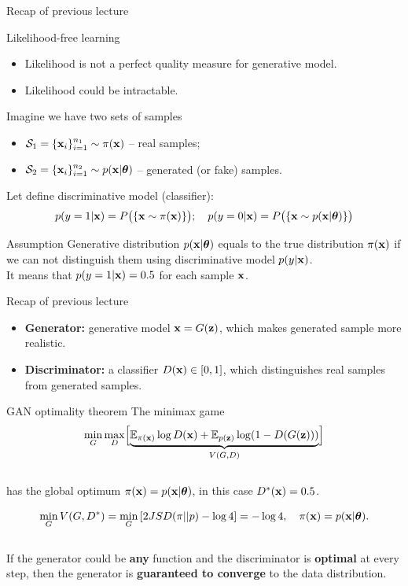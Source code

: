 \begin{frame}{Recap of previous lecture}
	\begin{block}{Likelihood-free learning}
		\begin{itemize}
			\item Likelihood is not a perfect quality measure for generative model.
			\item Likelihood could be intractable.
		\end{itemize}
	\end{block}
	Imagine we have two sets of samples 
	\begin{itemize}
		\item $\mathcal{S}_1 = \{\mathbf{x}_i\}_{i=1}^{n_1} \sim \pi(\mathbf{x})$ -- real samples;
		\item $\mathcal{S}_2 = \{\mathbf{x}_i\}_{i=1}^{n_2} \sim p(\mathbf{x} | \boldsymbol{\theta})$ -- generated (or fake) samples.
	\end{itemize}
	Let define discriminative model (classifier):
	\[
		p(y = 1 | \mathbf{x}) = P\bigl(\{\mathbf{x} \sim \pi(\mathbf{x})\}\bigr); \quad p(y = 0 | \mathbf{x}) = P\bigl(\{\mathbf{x} \sim p(\mathbf{x} | \boldsymbol{\theta})\}\bigr)
	\]
	\vspace{-0.5cm}
	\begin{block}{Assumption}
		Generative distribution $p(\mathbf{x} | \boldsymbol{\theta})$ equals to the true distribution $\pi(\mathbf{x})$ if we can not distinguish them using discriminative model $p(y | \mathbf{x})$. \\
		It means that $p(y = 1 | \mathbf{x}) = 0.5$ for each sample $\mathbf{x}$.
	\end{block}
\end{frame}
\begin{frame}{Recap of previous lecture}
	\begin{itemize}
		\item \textbf{Generator:} generative model $\mathbf{x} = G(\mathbf{z})$, which makes generated sample more realistic.
		\item \textbf{Discriminator:} a classifier $D(\mathbf{x}) \in [0, 1]$, which distinguishes real samples from generated samples.
	\end{itemize}
	\vspace{-0.1cm}
	\begin{block}{GAN optimality theorem}
		The minimax game 
		\vspace{-0.3cm}
		\[
		\min_{G} \max_D \Bigl[ \underbrace{\mathbb{E}_{\pi(\mathbf{x})} \log D(\mathbf{x}) + \mathbb{E}_{p(\mathbf{z})} \log (1 - D(G(\mathbf{z})))}_{V(G, D)} \Bigr]
		\]
		\vspace{-0.5cm} \\
		has the global optimum $\pi(\mathbf{x}) = p(\mathbf{x} | \boldsymbol{\theta})$, in this case $D^*(\mathbf{x}) = 0.5$.
	\end{block}
	\[
		\min_{G} V(G, D^*) = \min_{G} \left[ 2 JSD(\pi || p) - \log 4 \right] = -\log 4, \quad \pi(\mathbf{x}) = p(\mathbf{x} | \boldsymbol{\theta}).
	\]
	\vspace{-0.5cm} \\
	If the generator could be \textbf{any} function and the discriminator is \textbf{optimal} at every step, then the generator is \textbf{guaranteed to converge} to the data distribution.
\end{frame}
